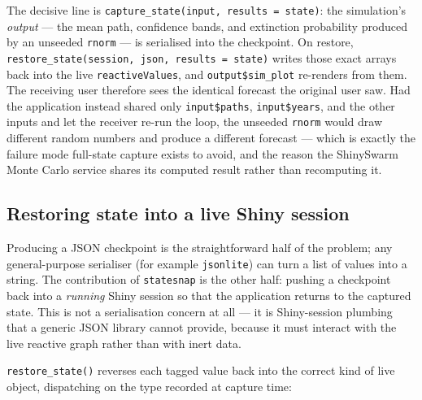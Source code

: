 \documentclass[11pt,a4paper]{article}
\begin{document}
The decisive line is \texttt{capture\_state(input, results = state)}: the
simulation's \emph{output} --- the mean path, confidence bands, and extinction
probability produced by an unseeded \texttt{rnorm} --- is serialised into the
checkpoint. On restore, \texttt{restore\_state(session, json, results = state)}
writes those exact arrays back into the live \texttt{reactiveValues}, and
\texttt{output\$sim\_plot} re-renders from them. The receiving user therefore sees
the identical forecast the original user saw. Had the application instead shared
only \texttt{input\$paths}, \texttt{input\$years}, and the other inputs and let
the receiver re-run the loop, the unseeded \texttt{rnorm} would draw different
random numbers and produce a different forecast --- which is exactly the failure
mode full-state capture exists to avoid, and the reason the ShinySwarm Monte Carlo
service shares its computed result rather than recomputing it.

\subsection{Restoring state into a live Shiny session}
\label{sec:restore}

Producing a JSON checkpoint is the straightforward half of the problem; any
general-purpose serialiser (for example \texttt{jsonlite}) can turn a list of
values into a string. The contribution of \texttt{statesnap} is the other half:
pushing a checkpoint back into a \emph{running} Shiny session so that the
application returns to the captured state. This is not a serialisation concern at
all --- it is Shiny-session plumbing that a generic JSON library cannot provide,
because it must interact with the live reactive graph rather than with inert
data.

\texttt{restore\_state()} reverses each tagged value back into the correct kind
of live object, dispatching on the type recorded at capture time:
\end{document}
